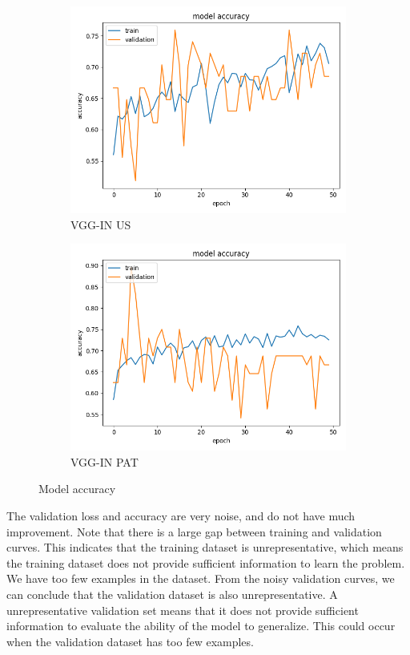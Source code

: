 \begin{figure}
\begin{subfigure}[b]{.45\linewidth}
\includegraphics[width=\linewidth]{Figs/vgg_in_us_acc.jpg}
\caption{VGG-IN US}
\end{subfigure}
\begin{subfigure}[b]{.45\linewidth}
\includegraphics[width=\linewidth]{Figs/vgg_in_pat_acc.jpg}
\caption{VGG-IN PAT}
\end{subfigure}
\caption{Model accuracy}
\label{fig:acc}
\end{figure}

The validation loss and accuracy are very noise, and do not have much improvement. Note that there is a large gap between training and validation curves. This indicates that the training dataset is unrepresentative, which means the training dataset does not provide sufficient information to learn the problem. We have too few examples in the dataset. From the noisy validation curves, we can conclude that the validation dataset is also unrepresentative. A  unrepresentative validation set means that it does not provide sufficient information to evaluate the ability of the model to generalize. This could occur when the validation dataset has too few examples.

